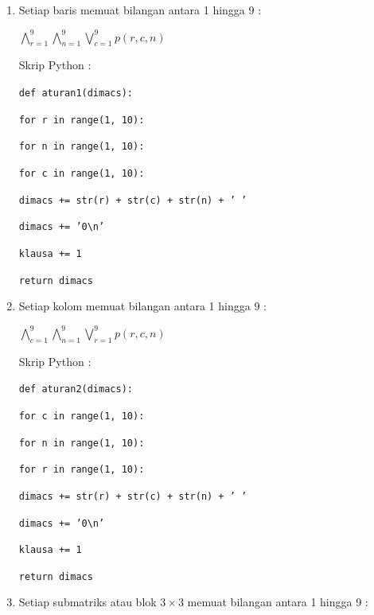 \begin{enumerate}
	\item Setiap baris memuat bilangan antara 1 
	hingga 9 : 
	
	$\bigwedge_{r=1}^{9}$$\bigwedge_{n=1}^{9}$$\bigvee_{c=1}^{9}$$p\left(r,c,n\right)$
	
	\vspace{5mm}
	
	Skrip Python :
	
	\vspace{5mm}
	
	\texttt{def aturan1(dimacs):}
	
	\quad\quad\texttt{for r in range(1, 10):}
	
	\quad\quad\quad\texttt{for n in range(1, 10):}
	
	\quad\quad\quad\quad\texttt{for c in range(1, 10):}
	
	\quad\quad\quad\quad\quad\texttt{dimacs += str(r) + str(c) + str(n) + ' '}
	
	\quad\quad\quad\quad\texttt{dimacs += '0\textbackslash n'}
	
	\quad\quad\quad\quad\texttt{klausa += 1}
	
	\quad\quad\texttt{return dimacs}
	
	
	\item Setiap kolom memuat bilangan antara 1 hingga 9 : 
	
	$\bigwedge_{c=1}^{9}$$\bigwedge_{n=1}^{9}$$\bigvee_{r=1}^{9}$$p\left(r,c,n\right)$
	
	
	\vspace{5mm}
	
	Skrip Python :
	
	\vspace{5mm}
	
	\texttt{def aturan2(dimacs):}
	
	\quad \quad\texttt{for c in range(1, 10):}
	
	\quad \quad \quad\texttt{for n in range(1, 10):}
	
	\quad \quad \quad \quad\texttt{for r in range(1, 10):}
	
	\quad\quad\quad\quad\quad\texttt{dimacs += str(r) + str(c) + str(n) + ' '}
	
	\quad \quad \quad \quad\texttt{dimacs += '0\textbackslash n'}
	
	\quad \quad \quad \quad\texttt{klausa += 1}
	
	\quad \quad\texttt{return dimacs}
	
	\item Setiap submatriks atau blok $3 \times 3$
	memuat bilangan antara 1 hingga 9 : 
	

\end{enumerate}
